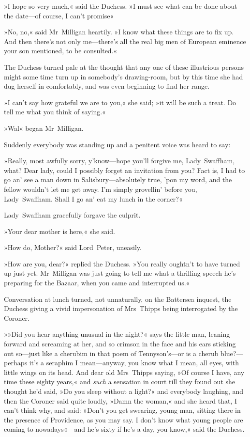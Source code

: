 »I hope so very much,« said the Duchess. »I must see what can be done about the date—of course, I can't promise\longdash«

»No, no,« said Mr~Milligan heartily. »I know what these things are to fix up. And then there's not only me—there's all the real big men of European eminence your son mentioned, to be consulted.«

The Duchess turned pale at the thought that any one of these illustrious persons might some time turn up in somebody's drawing-room, but by this time she had dug herself in comfortably, and was even beginning to find her range.

»I can't say how grateful we are to you,« she said; »it will be such a treat. Do tell me what you think of saying.«

»Wal\longdash« began Mr~Milligan.

Suddenly everybody was standing up and a penitent voice was heard to say:

»Really, most awfully sorry, y'know—hope you'll forgive me, Lady~Swaffham, what? Dear lady, could I possibly forget an invitation from you? Fact is, I had to go an' see a man down in Salisbury—absolutely true, 'pon my word, and the fellow wouldn't let me get away. I'm simply grovellin' before you, Lady~Swaffham. Shall I go an' eat my lunch in the corner?«

Lady~Swaffham gracefully forgave the culprit.

»Your dear mother is here,« she said.

»How do, Mother?« said Lord~Peter, uneasily.

»How are you, dear?« replied the Duchess. »You really oughtn't to have turned up just yet. Mr~Milligan was just going to tell me what a thrilling speech he's preparing for the Bazaar, when you came and interrupted us.«

Conversation at lunch turned, not unnaturally, on the Battersea inquest, the Duchess giving a vivid impersonation of Mrs~Thipps being interrogated by the Coroner.

»»Did you hear anything unusual in the night?« says the little man, leaning forward and screaming at her, and so crimson in the face and his ears sticking out so—just like a cherubim in that poem of Tennyson's—or is a cherub blue?---perhaps it's a seraphim I mean—anyway, you know what I mean, all eyes, with little wings on its head. And dear old Mrs~Thipps saying, »Of course I have, any time these eighty years,« and \textit{such} a sensation in court till they found out she thought he'd said, »Do you sleep without a light?« and everybody laughing, and then the Coroner said quite loudly, »Damn the woman,« and she heard that, I can't think why, and said: »Don't you get swearing, young man, sitting there in the presence of Providence, as you may say. I don't know what young people are coming to nowadays«---and he's sixty if he's a day, you know,« said the Duchess.

